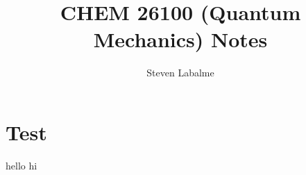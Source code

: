 \documentclass{report}
\title{CHEM 26100 (Quantum Mechanics) Notes}
\author{Steven Labalme}
\begin{document}
\maketitle



\tableofcontents
\newpage



\pagestyle{main}
\renewcommand{\chaptermark}[1]{\markboth{\chaptername\ \thechapter\ (#1)}{}}
\chapter{Test}
hello
\newpage
hi
\end{document}
